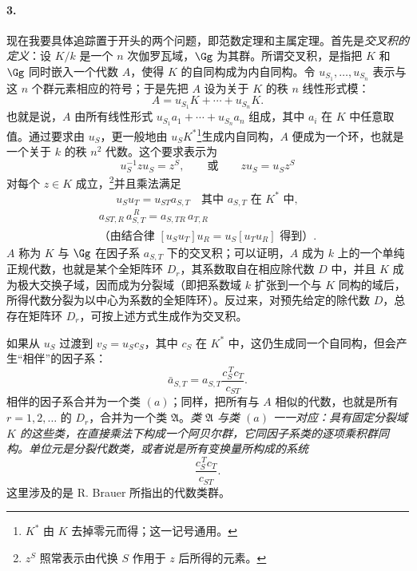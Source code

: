 \paragraph{3.}
现在我要具体追踪置于开头的两个问题，即范数定理和主属定理。首先是\emph{交叉积的定义}：设 \(K/k\) 是一个 \(n\) 次伽罗瓦域，\(\Gg\) 为其群。所谓交叉积，是指把 \(K\) 和 \(\Gg\) 同时嵌入一个代数 \(A\)，使得 \(K\) 的自同构成为内自同构。令 \(u_{S_1},\ldots,u_{S_n}\) 表示与这 \(n\) 个群元素相应的符号；于是先把 \(A\) 设为关于 \(K\) 的秩 \(n\) 线性形式模：
\[
\tag{1}
A=u_{S_1}K+\cdots+u_{S_n}K .
\]
也就是说，\(A\) 由所有线性形式 \(u_{S_1}a_1+\cdots+u_{S_n}a_n\) 组成，其中 \(a_i\) 在 \(K\) 中任意取值。通过要求由 \(u_S\)，更一般地由 \(u_SK^\ast\)\footnote{\(K^\ast\) 由 \(K\) 去掉零元而得；这一记号通用。}生成内自同构，\(A\) 便成为一个环，也就是一个关于 \(k\) 的秩 \(n^2\) 代数。这个要求表示为
\[
\tag{2}
u_S^{-1}zu_S=z^S,\qquad \text{或}\qquad zu_S=u_Sz^S
\]
对每个 \(z\in K\) 成立，\footnote{\(z^S\) 照常表示由代换 \(S\) 作用于 \(z\) 后所得的元素。}并且乘法满足
\[
\tag{3}
u_Su_T=u_{ST}a_{S,T}\quad \text{其中 }a_{S,T}\text{ 在 }K^\ast\text{ 中},
\]
\[
\tag{4}
\begin{gathered}
a_{ST,R}\,a_{S,T}^{\,R}=a_{S,TR}\,a_{T,R}\\
\text{（由结合律 \([u_Su_T]u_R=u_S[u_Tu_R]\) 得到）}.
\end{gathered}
\]
\(A\) 称为 \(K\) 与 \(\Gg\) 在因子系 \(a_{S,T}\) 下的交叉积；可以证明，\(A\) 成为 \(k\) 上的一个单纯正规代数，也就是某个全矩阵环 \(D_r\)，其系数取自在相应除代数 \(D\) 中，并且 \(K\) 成为极大交换子域，因而成为分裂域（即把系数域 \(k\) 扩张到一个与 \(K\) 同构的域后，所得代数分裂为以中心为系数的全矩阵环）。反过来，对预先给定的除代数 \(D\)，总存在矩阵环 \(D_r\)，可按上述方式生成作为交叉积。

如果从 \(u_S\) 过渡到 \(v_S=u_Sc_S\)，其中 \(c_S\) 在 \(K^\ast\) 中，这仍生成同一个自同构，但会产生“相伴”的因子系：
\[
\tag{5}
\bar a_{S,T}=a_{S,T}\frac{c_S^{\,T}c_T}{c_{ST}} .
\]
相伴的因子系合并为一个类 \((a)\)；同样，把所有与 \(A\) 相似的代数，也就是所有 \(r=1,2,\ldots\) 的 \(D_r\)，合并为一个类 \(\mathfrak A\)。\emph{类 \(\mathfrak A\) 与类 \((a)\) 一一对应：具有固定分裂域 \(K\) 的这些类，在直接乘法下构成一个阿贝尔群，它同因子系类的逐项乘积群同构。单位元是分裂代数类，或者说是所有变换量所构成的系统}
\[
        \frac{c_S^{\,T}c_T}{c_{ST}} .
\]
这里涉及的是 R. Brauer 所指出的代数类群。

